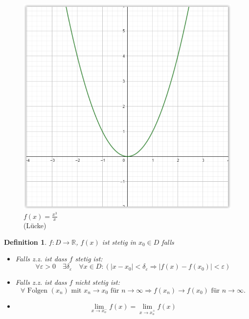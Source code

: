 \documentclass[12pt,a4paper]{report}%
\newtheorem{definition}[satz]{Definition}
\numberwithin{equation}{section}
\newcommand{\R}{\mathbb{R}} %
\numberwithin{equation}{subsection}
\begin{document}
  \begin{figure}[H] 
		\centering
	  \centering
	  \captionsetup{justification=centering}
	  \includegraphics[width=0.35\linewidth]{stetigkeit_luecke.png}
	  \caption{$f(x) = \frac{x^3}{x}$ \\ (Lücke)}
	  \label{fig:stetigkeit_luecke}
  \end{figure}
  \begin{definition}
    $f:D\rightarrow \R$, $f(x)$ ist stetig in $x_0 \in D$ falls \newline
    \begin{itemize}
      \item[1) ] Falls z.z. ist dass $f$ stetig ist:
      \begin{equation}
        \forall \varepsilon > 0 \quad \exists \delta_\varepsilon \quad \forall x \in D: \left(|x-x_0| < \delta_\varepsilon \Rightarrow |f(x) - f(x_0)| < \varepsilon \right)
      \end{equation}
      \item[2) ] Falls z.z. ist dass $f$ nicht stetig ist:
      \begin{equation}
        \forall \text{ Folgen } (x_n) \text{ mit }x_n \rightarrow x_0 \text{ für }n \rightarrow \infty \Rightarrow f(x_n) \rightarrow f(x_0) \text{ für } n \rightarrow \infty.
      \end{equation}
      \item[2) ] 
      \begin{equation}
        \lim\limits_{x \rightarrow x_o^-} f(x) = \lim\limits_{x \rightarrow x_o^+} f(x)
        \end{equation}
    \end{itemize}
  \end{definition}
\end{document}
